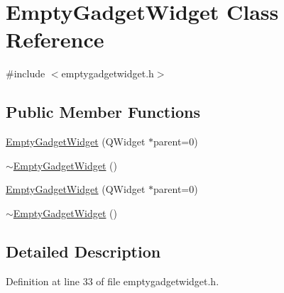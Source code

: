 \hypertarget{class_empty_gadget_widget}{\section{\-Empty\-Gadget\-Widget \-Class \-Reference}
\label{class_empty_gadget_widget}
}


{\ttfamily \#include $<$emptygadgetwidget.\-h$>$}

\subsection*{\-Public \-Member \-Functions}
\begin{DoxyCompactItemize}
\item 
\hyperlink{group___empty_gadget_plugin_ga49fd1e7c797821911cc8c1aaf39af255}{\-Empty\-Gadget\-Widget} (\-Q\-Widget $\ast$parent=0)
\item 
\hyperlink{group___empty_gadget_plugin_ga31f0094726f11e434e12aaa0a764d467}{$\sim$\-Empty\-Gadget\-Widget} ()
\item 
\hyperlink{class_empty_gadget_widget_ga49fd1e7c797821911cc8c1aaf39af255}{\-Empty\-Gadget\-Widget} (\-Q\-Widget $\ast$parent=0)
\item 
\hyperlink{class_empty_gadget_widget_ga31f0094726f11e434e12aaa0a764d467}{$\sim$\-Empty\-Gadget\-Widget} ()
\end{DoxyCompactItemize}


\subsection{\-Detailed \-Description}


\-Definition at line 33 of file emptygadgetwidget.\-h.



